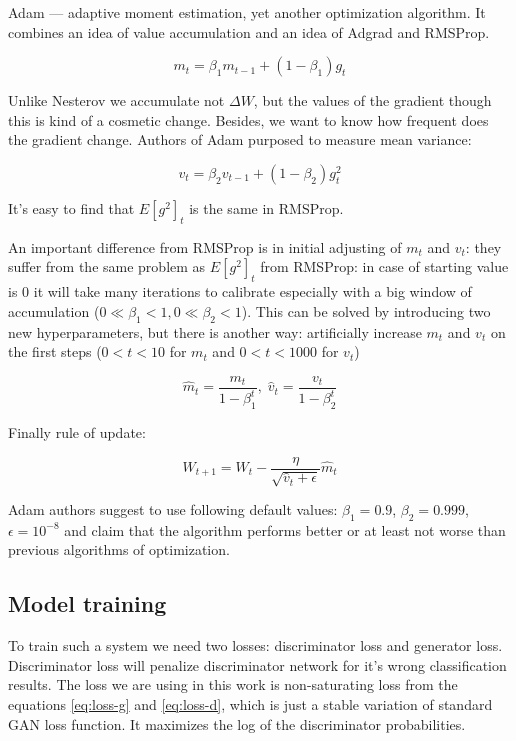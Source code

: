 Adam — adaptive moment estimation, yet another optimization algorithm. It combines an idea of value accumulation and an idea of Adgrad and RMSProp.

\begin{equation}
    m_t = \beta_1 m_{t-1} + (1 - \beta_1) g_t
\end{equation}

Unlike Nesterov we accumulate not $\Delta W$, but the values of the gradient though this is kind of a cosmetic change. Besides, we want to know how frequent does the gradient change. Authors of Adam purposed to measure mean variance:

\begin{equation}
    v_t = \beta_2 v_{t-1} + (1 - \beta_2) g_t^2
\end{equation}

It's easy to find that $E[g^2]_t$ is the same in RMSProp.

An important difference from RMSProp is in initial adjusting of $m_t$ and $v_t$: they suffer from the same problem as $E[g^2]_t$ from RMSProp: in case of starting value is $0$ it will take many iterations to calibrate especially with a big window of accumulation ($0 \ll \beta_1 < 1, 0 \ll \beta_2 < 1$). This can be solved by introducing two new hyperparameters, but there is another way: artificially increase $m_t$ and $v_t$ on the first steps ($0 < t < 10$ for $m_t$ and $0 < t < 1000$ for $v_t$)

\begin{equation}
    \hat{m}_t = \frac{m_t}{1 - \beta^t_1}, \;
    \hat{v}_t = \frac{v_t}{1 - \beta^t_2}
\end{equation}

Finally rule of update:

\begin{equation}
    W_{t+1} = W_{t} - \dfrac{\eta}{\sqrt{\hat{v}_t + \epsilon}} \hat{m}_t
\end{equation}

Adam authors suggest to use following default values: $\beta_1 = 0.9$, $\beta_2 = 0.999$, $\epsilon = 10^{-8}$ and claim that the algorithm performs better or at least not worse than previous algorithms of optimization.

\subsection{Model training}

To train such a system we need two losses: discriminator loss and generator loss. Discriminator loss will penalize discriminator network for it's wrong classification results. The loss we are using in this work is non-saturating loss from the equations \ref{eq:loss-g} and \ref{eq:loss-d}, which is just a stable variation of standard GAN loss function. It maximizes the log of the discriminator probabilities.

